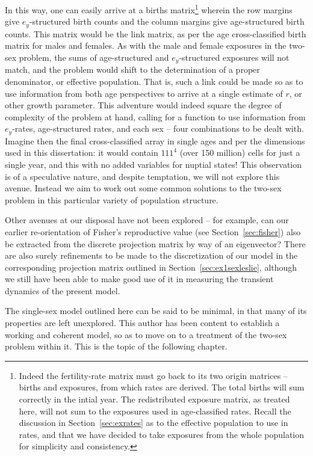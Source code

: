 In this
way, one can easily arrive at a births matrix\footnote{Indeed the fertility-rate
matrix must go back to its two origin matrices -- births and exposures, from
which rates are derived. The total births will sum correctly in the intial
year. The redistributed exposure matrix, as treated here, will not sum to
the exposures used in age-classified rates. Recall the discussion in
Section~\ref{sec:exrates} as to the effective population to use in rates, and
that we have decided to take exposures from the whole population for simplicity
and consistency.} wherein the row margins give $e_y$-structured birth counts and
the column margins give age-structured birth counts. This matrix would be
the link matrix, as per the age cross-classified birth matrix for males and
females. As with the male and female exposures in the two-sex problem, the sums 
of age-structured and
$e_y$-structured exposures will not match, and the problem would shift to the 
determination of a proper denominator, or effective population. That is, such a
link could be made so as to use information from both age perspectives to arrive
at a single estimate of $r$, or other growth parameter. This adventure would
indeed square the degree of complexity of the problem at hand, calling
for a function to use information from $e_y$-rates, age-structured rates, and
each sex -- four combinations to be dealt with. Imagine then the final
cross-classified array in single ages and per the dimensions used in this dissertation: it would
contain $111^4$ (over 150 million) cells for just a single year, and this with
no added variables for nuptial states! This observation is of a speculative nature, and despite
temptation, we will not explore this avenue. Instead we aim to work out some 
common solutions to the two-sex problem in this particular variety of population structure.

Other avenues at our disposal have not been explored -- for example, can our
earlier re-orientation of Fisher's reproductive value (see
Section~\ref{sec:fisher}) also be extracted from the discrete projection
matrix by way of an eigenvector? There are also surely refinements to be made to the discretization of our model
in the corresponding projection matrix outlined in
Section~\ref{sec:ex1sexleslie}, although we still have been able to make good
use of it in measuring the transient dynamics of the present model.

The single-sex model outlined here can be said to be minimal, in that many of
its properties are left unexplored. This author has been content to establish a
working and coherent model, so as to move on to a treatment of the two-sex
problem within it. This is the topic of the following chapter.
